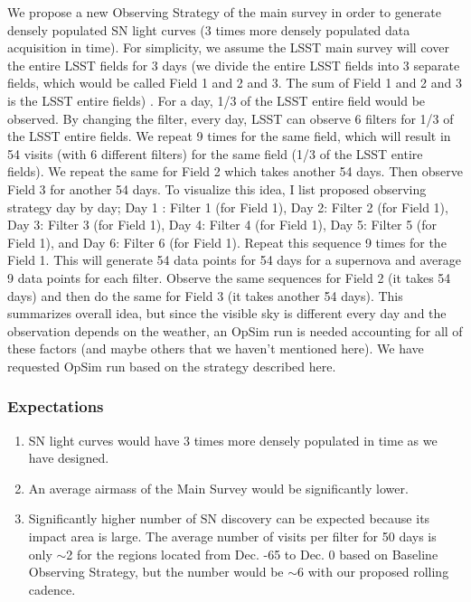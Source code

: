 We propose a new Observing Strategy of the main survey in order to generate densely
populated SN light curves (3 times more densely populated data acquisition in time). For
simplicity, we assume the LSST main survey will cover the entire LSST fields for 3 days
(we divide the entire LSST fields into 3 separate fields, which would be called Field 1
and 2 and 3. The sum of Field 1 and 2 and 3 is the LSST entire fields) . For a day, 1/3 of
the LSST entire field would be observed. By changing the filter, every day, LSST can
observe 6 filters for 1/3 of the LSST entire fields. We repeat 9 times for the same field,
which will result in 54 visits (with 6 different filters) for the same field (1/3 of the
LSST entire fields). We repeat the same for Field 2 which takes another 54 days. Then
observe Field 3 for another 54 days. To visualize this idea, I list proposed observing
strategy day by day; Day 1 : Filter 1 (for Field 1), Day 2: Filter 2 (for Field 1), Day 3:
Filter 3 (for Field 1), Day 4: Filter 4 (for Field 1), Day 5: Filter 5 (for Field 1), and
Day 6: Filter 6 (for Field 1). Repeat this sequence 9 times for the Field 1. This will
generate 54 data points for 54 days for a supernova and average 9 data points for each
filter. Observe the same sequences for Field 2 (it takes 54 days) and then do the same for
Field 3 (it takes another 54 days). This summarizes overall idea, but since the visible
sky is different every day and the observation depends on the weather, an OpSim run is
needed accounting for all of these factors (and maybe others that we haven't mentioned
here). We have requested OpSim run based on the strategy described here.

\subsubsection{Expectations} 

\begin{enumerate}
\item SN light curves would have 3 times more densely populated in time as we have designed.
\item An average airmass of the Main Survey would be significantly lower.
\item Significantly higher number of SN discovery can be expected because its impact area is
large. The average number of visits per filter for 50 days is only $\sim$2 for the regions
located from Dec. -65 to Dec. 0 based on Baseline Observing Strategy, but the number would
be $\sim$6 with our proposed rolling cadence.
\end{enumerate}




